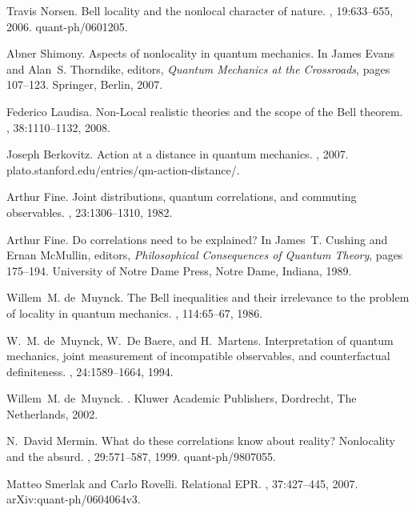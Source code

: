 \documentclass[12pt]{article} %
\begin{document}
\begin{thebibliography}{10}
Travis Norsen.
\newblock Bell locality and the nonlocal character of nature.
, 19:633--655, 2006.
\newblock quant-ph/0601205.

Abner Shimony.
\newblock Aspects of nonlocality in quantum mechanics.
\newblock In James Evans and Alan~S. Thorndike, editors, {\em Quantum Mechanics
  at the Crossroads}, pages 107--123. Springer, Berlin, 2007.

Federico Laudisa.
\newblock Non-{L}ocal realistic theories and the scope of the {B}ell theorem.
, 38:1110--1132, 2008.

Joseph Berkovitz.
\newblock Action at a distance in quantum mechanics.
, 2007.
\newblock plato.stanford.edu/entries/qm-action-distance/.

Arthur Fine.
\newblock Joint distributions, quantum correlations, and commuting observables.
, 23:1306--1310, 1982.

Arthur Fine.
\newblock Do correlations need to be explained?
\newblock In James~T. Cushing and Ernan McMullin, editors, {\em Philosophical
  Consequences of Quantum Theory}, pages 175--194. University of Notre Dame
  Press, Notre Dame, Indiana, 1989.

Willem~M. de~Muynck.
\newblock The {B}ell inequalities and their irrelevance to the problem of
  locality in quantum mechanics.
, 114:65--67, 1986.

W.~M. de~Muynck, W.~De Baere, and H.~Martens.
\newblock Interpretation of quantum mechanics, joint measurement of
  incompatible observables, and counterfactual definiteness.
, 24:1589--1664, 1994.

Willem~M. de~Muynck.
.
\newblock Kluwer Academic Publishers, Dordrecht, The Netherlands, 2002.

N.~David Mermin.
\newblock What do these correlations know about reality? {N}onlocality and the
  absurd.
, 29:571--587, 1999.
\newblock quant-ph/9807055.

Matteo Smerlak and Carlo Rovelli.
\newblock Relational {E}{P}{R}.
, 37:427--445, 2007.
\newblock arXiv:quant-ph/0604064v3.


\end{thebibliography}
\end{document}
